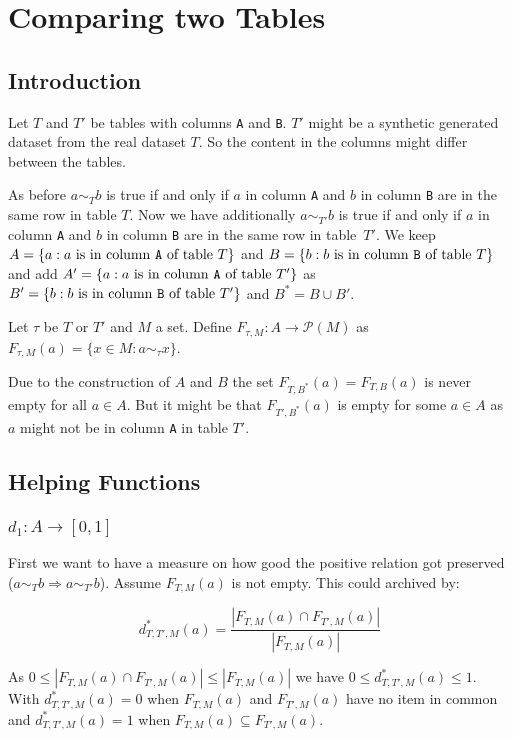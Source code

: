 \section{Comparing two Tables}
\subsection{Introduction}

Let $T$ and $T'$ be tables with columns \texttt{A} and \texttt{B}.
$T'$ might be a synthetic generated dataset from the real dataset $T$.
So the content in the columns might differ between the tables.

As before $a \sim_T b$ is true if and only if $a$ in column \texttt{A} and $b$ in column \texttt{B} are in the same row in table $T$.
Now we have additionally $a \sim_{T'} b$ is true if and only if $a$ in column \texttt{A} and $b$ in column \texttt{B} are in the same row in table~$T'$.
We keep $A = \{ a : a \mbox{ is in column \texttt{A} of table } T \}$ and $B = \{ b : b \mbox{ is in column \texttt{B} of table } T \}$ and add $A' = \{ a : a \mbox{ is in column \texttt{A} of table } T' \}$ as $B' = \{ b : b \mbox{ is in column \texttt{B} of table } T' \}$ and $B^* = B \cup B'$.

Let $\tau$ be $T$ or $T'$ and $M$ a set.
Define $F_{\tau, M} : A \to \mathcal{P}(M)$ as $F_{\tau, M}(a) = \{ x \in M : a \sim_\tau x \}$.

Due to the construction of $A$ and $B$ the set $F_{T,B^*}(a) = F_{T,B}(a)$ is never empty for all $a \in A$.
But it might be that $F_{T',B^*}(a)$ is empty for some $a \in A$ as $a$ might not be in column \texttt{A} in table $T'$.


\subsection{Helping Functions}
\subsubsection{$d_1 : A \to [0,1]$}
First we want to have a measure on how good the positive relation got preserved ($a \sim_T b \Rightarrow a \sim_{T'} b$).
Assume $F_{T, M}(a)$ is not empty. 
This could archived by:

\[
  d^*_{T,T',M}(a) = 
    \frac{\left|F_{T, M}(a) \cap F_{T', M}(a)\right|}{|F_{T, M}(a)|}
\]


As $0 \leq \left|F_{T, M}(a) \cap F_{T', M}(a)\right| \leq |F_{T, M}(a)|$ we have $0 \leq d^*_{T, T', M}(a) \leq 1$.
With $d^*_{T, T', M}(a) = 0$ when $F_{T, M}(a)$ and $F_{T', M}(a)$ have no item in common
and $d^*_{T, T', M}(a) = 1$ when $F_{T, M}(a) \subseteq F_{T', M}(a)$.

